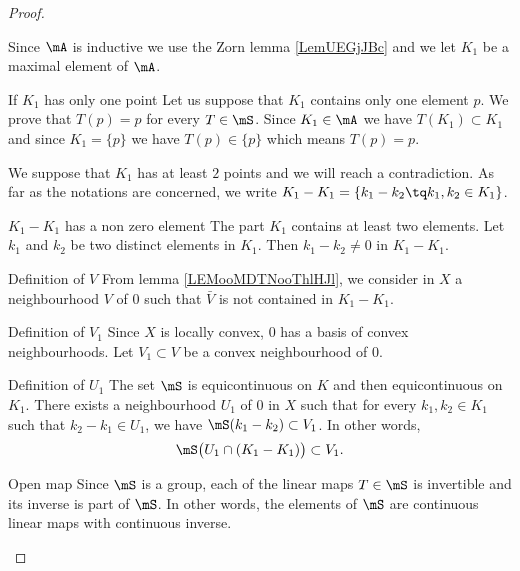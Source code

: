 \begin{proof}
\begin{subproof}
        Since \( \mA\) is inductive we use the Zorn lemma \ref{LemUEGjJBc} and we let \( K_1\) be a maximal element of \( \mA\).
    \item[If \( K_1\) has only one point]
        Let us suppose that \( K_1\) contains only one element \( p\). We prove that \( T(p)=p\) for every \( T\in\mS\). Since \( K_1\in \mA\) we have \( T(K_1)\subset K_1\) and since \( K_1=\{ p \}\) we have \( T(p)\in \{ p \}\) which means \( T(p)=p\).
    \end{subproof}
    We suppose that \( K_1\) has at least \( 2\) points and we will reach a contradiction. As far as the notations are concerned, we write \( K_1-K_1=\{ k_1-k_2\tq k_1,k_2\in K_1 \}\).
    \begin{subproof}
    \item[\( K_1-K_1\) has a non zero element]
        The part \( K_1\) contains at least two elements. Let \( k_1\) and \( k_2\) be two distinct elements in \( K_1\). Then \( k_1-k_2\neq 0\) in \( K_1-K_1\).
    \item[Definition of \( V\)]
        From lemma \ref{LEMooMDTNooThlHJl}, we consider in \( X\) a neighbourhood \( V\) of \( 0\) such that \( \bar V\) is not contained in \( K_1-K_1\).
    \item[Definition of \( V_1\)]
        Since \( X\) is locally convex, \( 0\) has a basis of convex neighbourhoods. Let \( V_1\subset V\) be a convex neighbourhood of \( 0\).
    \item[Definition of \( U_1\)]
        The set \( \mS\) is equicontinuous on \( K\) and then equicontinuous on \( K_1\). There exists a neighbourhood \( U_1\) of \( 0\) in \( X\) such that for every \( k_1,k_2\in K_1\) such that \( k_2-k_1\in U_1\), we have \( \mS(k_1-k_2)\subset  V_1\). In other words,
        \begin{equation}        \label{EQooPELQooJgcrzr}
            \mS\big( U_1\cap(K_1-K_1) \big)\subset V_1.
        \end{equation}
    \item[Open map]
        Since \( \mS\) is a group, each of the linear maps \( T\in\mS\) is invertible and its inverse is part of \( \mS\). In other words, the elements of \( \mS\) are continuous linear maps with continuous inverse.


\end{subproof}
\end{proof}
